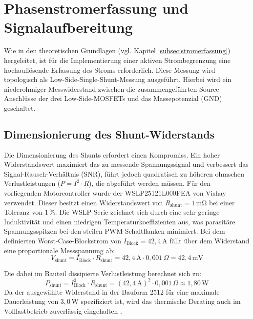 
\section{Phasenstromerfassung und Signalaufbereitung}
\label{sec:stromerfassung_hardware}

Wie in den theoretischen Grundlagen (vgl. Kapitel \ref{subsec:stromerfassung}) hergeleitet, ist für die Implementierung einer aktiven Strombegrenzung eine hochauflösende Erfassung des Stroms erforderlich. Diese Messung wird topologisch als Low-Side-Single-Shunt-Messung ausgeführt. Hierbei wird ein niederohmiger Messwiderstand zwischen die zusammengeführten Source-Anschlüsse der drei Low-Side-MOSFETs und das Massepotenzial (GND) geschaltet.

\subsection{Dimensionierung des Shunt-Widerstands}
Die Dimensionierung des Shunts erfordert einen Kompromiss. Ein hoher Widerstandswert maximiert das zu messende Spannungssignal und verbessert das Signal-Rausch-Verhältnis (SNR), führt jedoch quadratisch zu höheren ohmschen Verlustleistungen ($P = I^2 \cdot R$), die abgeführt werden müssen. 
Für den vorliegenden Motorcontroller wurde der WSLP25121L000FEA von Vishay \cite{DS_SHUNT} verwendet. Dieser besitzt einen Widerstandswert von $R_{\mathrm{shunt}} = 1\,\mathrm{m\Omega}$ bei einer Toleranz von $1\,\%$. Die WSLP-Serie zeichnet sich durch eine sehr geringe Induktivität und einen niedrigen Temperaturkoeffizienten aus, was parasitäre Spannungsspitzen bei den steilen PWM-Schaltflanken minimiert. Bei dem definierten Worst-Case-Blockstrom von $I_{\mathrm{Block}} = 42{,}4\,\mathrm{A}$ fällt über dem Widerstand eine proportionale Messspannung ab:
\begin{equation}
    V_{\mathrm{shunt}} = I_{\mathrm{Block}} \cdot R_{\mathrm{shunt}} = 42{,}4\,\mathrm{A} \cdot 0{,}001\,\Omega = 42{,}4\,\mathrm{mV}
\end{equation}

Die dabei im Bauteil dissipierte Verlustleistung berechnet sich zu:
\begin{equation}
    P_{\mathrm{shunt}} = I_{\mathrm{Block}}^2 \cdot R_{\mathrm{shunt}} = (42{,}4\,\mathrm{A})^2 \cdot 0{,}001\,\Omega \approx 1{,}80\,\mathrm{W}
\end{equation}
Da der ausgewählte Widerstand in der Bauform 2512 für eine maximale Dauerleistung von $3{,}0\,\mathrm{W}$ spezifiziert ist, wird das thermische Derating auch im Volllastbetrieb zuverlässig eingehalten \cite{DS_SHUNT}.

